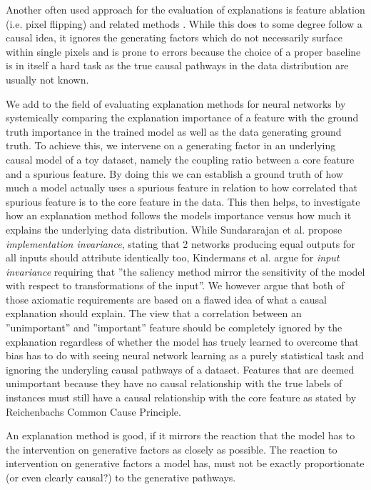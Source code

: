 {Another often used approach for the evaluation of explanations is feature ablation (i.e. pixel flipping) and related methods \cite{Samek2017a, } . While this does to some degree follow a causal idea, it ignores the generating factors which do not necessarily surface within single pixels and is prone to errors because the choice of a proper baseline is in itself a hard task as the true causal pathways in the data distribution are usually not known. 


We add to the field of evaluating explanation methods for neural networks by systemically comparing the explanation importance of a feature with the ground truth importance in the trained model as well as the data generating ground truth. To achieve this, we intervene on a generating factor in an underlying causal model of a toy dataset, namely the coupling ratio between a core feature and a spurious feature. By doing this we can establish a ground truth of how much a model actually uses a spurious feature in relation to how correlated that spurious feature is to the core feature in the data. This then helps, to investigate how an explanation method follows the models importance versus how much it explains the underlying data distribution. While Sundararajan et al. \cite{Sundararajan2017} propose \textit{implementation invariance}, stating that 2 networks producing equal outputs for all inputs should attribute identically too, Kindermans et al. \cite{Kindermans2019} argue for \textit{input invariance} requiring that ''the saliency method mirror the sensitivity of the model with respect to transformations of the input''.
We however argue that both of those axiomatic requirements are based on a flawed idea of what a causal explanation should explain. 
The view that a correlation between an ''unimportant'' and ''important'' feature should be completely ignored by the explanation regardless of whether the model has truely learned to overcome that bias has to do with seeing neural network learning as a purely statistical task and ignoring the underyling causal pathways of a dataset. 
Features that are deemed unimportant because they have no causal relationship with the true labels of instances must still have a causal relationship with the core feature as stated by Reichenbachs Common Cause Principle. 

An explanation method is good, if it mirrors the reaction that the model has to the intervention on generative factors as closely as possible. The reaction to intervention on generative factors a model has, must not be exactly proportionate (or even clearly causal?) to the generative pathways.

}
